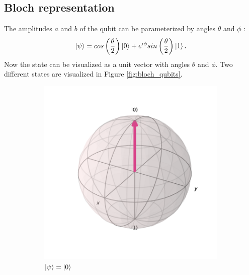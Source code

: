 	\subsection{Bloch representation}
		The amplitudes $a$ and $b$ of the qubit can be parameterized by angles $\theta$ and $\phi$ \cite{Desurvire2009-sp}:
		\begin{equation}
			\label{eq:bloch_parameterization}
			\ket{\psi}=cos\left(\frac{\theta}{2}\right)\ket{0}+e^{i\phi}sin\left(\frac{\theta}{2}\right)\ket{1}.
		\end{equation}
		Now the state can be visualized as a unit vector with angles $\theta$ and $\phi$.
		Two different states are visualized in Figure \ref{fig:bloch_qubits}.
		\begin{figure}[H]
			\centering
			\begin{subfigure}{.35\textwidth}
				\centering
				\includegraphics[width=0.95\linewidth]{figures/bloch_0.pdf}
				\caption{$\ket{\psi}=\ket{0}$}
			\end{subfigure}%
			\begin{subfigure}{.35\textwidth}
				\centering

\end{subfigure}
\end{figure}
